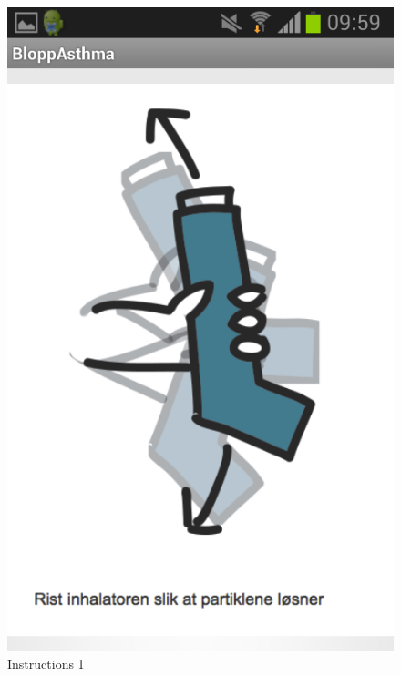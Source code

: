 \begin{figure}
	\begin{minipage}[b]{0.3\linewidth}
		\centering
		\includegraphics[width=0.20\paperwidth]{Pictures/app-screenshots/instructions-1.png}
		\caption{Instructions 1}
		\label{fig:instructions-1}
	\end{minipage}
	\begin{minipage}[b]{0.3\linewidth}
		\centering

\end{minipage}
\end{figure}
